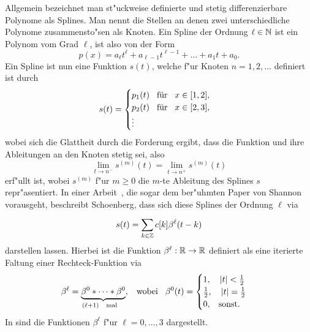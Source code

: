 Allgemein bezeichnet man st"uckweise definierte und stetig differenzierbare Polynome als Splines. 
Man nennt die Stellen an denen zwei unterschiedliche Polynome zusammensto"sen als Knoten. 
Ein Spline der Ordnung $\ell \in \mathbb{N}$ ist ein Polynom vom Grad $\ell$, ist also von der Form
\begin{equation}
    p(x) = 
        a_{\ell} t^{\ell} 
        + a_{\ell - 1} t^{\ell-1} 
        + \dots
        + a_1 t 
        + a_{0}.
\end{equation}
%
Ein Spline ist nun eine Funktion $s(t)$, welche f"ur Knoten $n = 1, 2, \dots$ definiert ist durch
\begin{equation}
    s(t) = \begin{cases}
        p_1(t) {\hspace{3mm} \text{f\"ur} \hspace{3mm}} x \in [1,2], \\
        p_2(t) {\hspace{3mm} \text{f\"ur} \hspace{3mm}} x \in [2,3], \\
        \vdots
    \end{cases}
\end{equation}
wobei sich die Glattheit durch die Forderung ergibt, dass die Funktion und ihre Ableitungen an den Knoten stetig sei, also
\begin{equation}
    \lim\limits_{t \rightarrow n^-} s^{(m)}(t) =
    \lim\limits_{t \rightarrow n^+} s^{(m)}(t)
\end{equation}
erf"ullt ist, wobei $s^{(m)}$ f"ur $m \geqslant 0$ die $m$-te Ableitung des Splines $s$ repr"asentiert. 
In einer Arbeit~\cite{schoenberg1988bsplines}, die sogar dem ber"uhmten Paper von Shannon vorausgeht, beschreibt Schoenberg, dass sich diese Splines der Ordnung $\ell$ via
\begin{equation}\label{eq:bsplines:summation}
    s(t) = {\sum\limits_{k \in \mathbb{Z}}^{}{
        c[k] \beta^{\ell}(t - k)
    }}
\end{equation}
darstellen lassen. Hierbei ist die Funktion $\beta^\ell: \mathbb{R} \rightarrow \mathbb{R}$ definiert als eine iterierte Faltung einer Rechteck-Funktion via
\begin{equation}
    \beta^\ell = \underbrace{
        \beta^0 \ast \dots \ast \beta^0
    }_{(\ell+1) {\hspace{3mm} \text{mal} \hspace{3mm}}}, 
    {\hspace{3mm} \text{wobei} \hspace{3mm}}
    \beta^0(t) = \begin{cases}
        1,\quad {\left| t \right|} < \frac{1}{2} \\
        \frac{1}{2}, \quad {\left| t \right|} = \frac{1}{2} \\
        0, {\hspace{3mm} \text{sonst.} \hspace{3mm}}
    \end{cases}
\end{equation}
In  sind die Funktionen $\beta^\ell$ f"ur $\ell = 0, \dots, 3$ dargestellt. 
